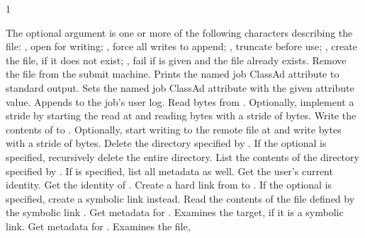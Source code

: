 \begin{ManPage}{\label{man-condor-chirp}}{1}
\begin{description}
{    The optional  argument is one or more of 
    the following characters describing the  file:
      ,  open for writing;
      ,  force all writes to append;
      ,  truncate before use;
      ,  create the file, if it does not exist;
      ,  fail if  is given and the file already exists.
    }
    {Remove the  file from the submit machine.}
    {Prints the named job ClassAd attribute to standard output.}
    {Sets the named job ClassAd attribute with the given attribute value.}
    {Appends  to the job's user log.}
    {Read  bytes from . Optionally,
    implement a stride by
    starting the read at  and reading  bytes
    with a stride of  bytes.}
    {Write the contents of  to .
    Optionally, start writing to the remote file at  and write
	 bytes with a stride of  bytes.}
    {Delete the directory specified by . 
    If the optional  is specified, 
    recursively delete the entire directory.}
    {List the contents of the directory specified by . 
    If  is specified, list all metadata as well.}
    {Get the user's current identity.}
    {Get the identity of .}
    {Create a hard link from  to . 
    If the optional  is specified, create a symbolic link instead.}
    {Read the contents of the file defined by the symbolic link 
    .}
    {Get metadata for . Examines the target, 
    if it is a symbolic link.}
    {Get metadata for . Examines the file,
}
\end{description}
\end{ManPage}
